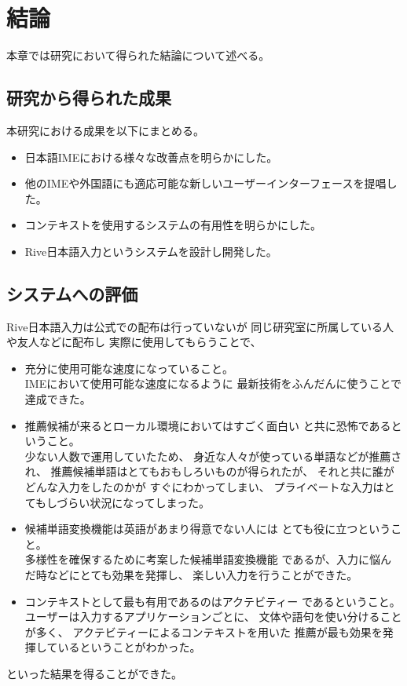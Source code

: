 \chapter{結論}
\label{chap:conclusion}
本章では研究において得られた結論について述べる。

\newpage
\section{研究から得られた成果}
本研究における成果を以下にまとめる。
\begin{itemize}
  \item 日本語IMEにおける様々な改善点を明らかにした。
  \item 他のIMEや外国語にも適応可能な新しいユーザーインターフェースを提唱した。
  \item コンテキストを使用するシステムの有用性を明らかにした。
  \item Rive日本語入力というシステムを設計し開発した。
\end{itemize}

\section{システムへの評価}
Rive日本語入力は公式での配布は行っていないが
同じ研究室に所属している人や友人などに配布し
実際に使用してもらうことで、
\begin{itemize}
  \item 充分に使用可能な速度になっていること。\mbox{}\\
    IMEにおいて使用可能な速度になるように
    最新技術をふんだんに使うことで達成できた。
  \item 推薦候補が来るとローカル環境においてはすごく面白い
    と共に恐怖であるということ。\mbox{}\\
    少ない人数で運用していたため、
    身近な人々が使っている単語などが推薦され、
    推薦候補単語はとてもおもしろいものが得られたが、
    それと共に誰がどんな入力をしたのかが
    すぐにわかってしまい、
    プライベートな入力はとてもしづらい状況になってしまった。
  \item 候補単語変換機能は英語があまり得意でない人には
    とても役に立つということ。\mbox{}\\
    多様性を確保するために考案した候補単語変換機能
    であるが、入力に悩んだ時などにとても効果を発揮し、
    楽しい入力を行うことができた。
  \item コンテキストとして最も有用であるのはアクテビティー
  であるということ。\mbox{}\\
    ユーザーは入力するアプリケーションごとに、
    文体や語句を使い分けることが多く、
    アクテビティーによるコンテキストを用いた
    推薦が最も効果を発揮しているということがわかった。
\end{itemize}
といった結果を得ることができた。

